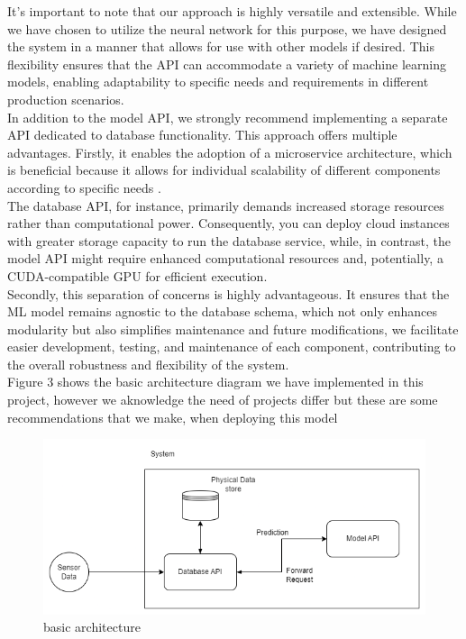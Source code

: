 \documentclass{article}
\begin{document}
It's important to note that our approach is highly versatile and extensible. While we have chosen to utilize the neural network for this purpose, we have designed the system in a manner that allows for use with other models if desired. This flexibility ensures that the API can accommodate a variety of machine learning models, enabling adaptability to specific needs and requirements in different production scenarios.\\

In addition to the model API, we strongly recommend implementing a separate API dedicated to database functionality. This approach offers multiple advantages. Firstly, it enables the adoption of a microservice architecture, which is beneficial because it allows for individual scalability of different components according to specific needs \cite{Patel2021}. \\

The database API, for instance, primarily demands increased storage resources rather than computational power. Consequently, you can deploy cloud instances with greater storage capacity to run the database service, while, in contrast, the model API might require enhanced computational resources and, potentially, a CUDA-compatible GPU for efficient execution.\\

Secondly, this separation of concerns is highly advantageous. It ensures that the ML model remains agnostic to the database schema, which not only enhances modularity but also simplifies maintenance and future modifications, we facilitate easier development, testing, and maintenance of each component, contributing to the overall robustness and flexibility of the system. \\

Figure 3 shows the basic architecture diagram we have implemented in this project, however we aknowledge the need of projects differ but these are some recommendations that we make, when deploying this model

\begin{figure}
    \centering
    \includegraphics[width=1\linewidth]{architecture_basic.png}
    \caption{basic architecture}
    \label{fig:architecture}
\end{figure}



\newpage



\end{document}
